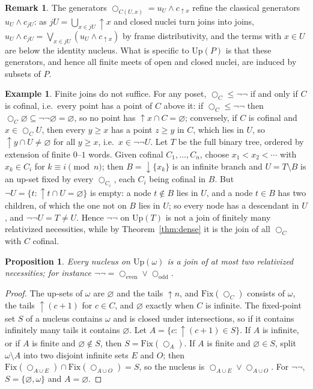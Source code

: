 \documentclass[11pt]{amsart}
\newtheorem{prop}[thm]{Proposition}
\theoremstyle{definition}
\newtheorem{rem}[thm]{Remark}
\newtheorem{ex}[thm]{Example}
\newcommand{\Fix}{\mathrm{Fix}}
\newcommand{\Up}{\mathrm{Up}}
\newcommand{\lax}{\bigcirc}
\newcommand{\dn}{{\downarrow}}
\newcommand{\upa}{{\uparrow}}
\begin{document}
\begin{rem}
The generators $\lax_{C(U,x)}=u_U\wedge c_{\upa x}$ refine the classical
generators $u_U\wedge c_{jU}$: as $jU=\bigcup_{x\in jU}\upa x$ and closed
nuclei turn joins into joins, $u_U\wedge c_{jU}=\bigvee_{x\in jU}(u_U\wedge
c_{\upa x})$ by frame distributivity, and the terms with $x\in U$ are below
the identity nucleus. What is specific to $\Up(P)$ is that these generators,
and hence all finite meets of open and closed nuclei, are induced by subsets
of $P$.
\end{rem}

\begin{ex}\label{ex:tree}
Finite joins do not suffice. For any poset, $\lax_C\le\neg\neg$ if and only
if $C$ is cofinal, i.e.\ every point has a point of $C$ above it: if
$\lax_C\le\neg\neg$ then $\lax_C\varnothing\subseteq\neg\neg\varnothing=
\varnothing$, so no point has $\upa x\cap C=\varnothing$; conversely, if $C$ is cofinal and $x\in\lax_CU$, then every $y\ge x$ has
a point $z\ge y$ in $C$, which lies in $U$, so $\upa y\cap U\ne\varnothing$
for all $y\ge x$, i.e.\ $x\in\neg\neg U$. Let
$T$ be the full binary tree, ordered by extension of finite $0$--$1$ words.
Given cofinal $C_1,\dots,C_n$, choose $x_1<x_2<\cdots$ with $x_k\in C_i$ for
$k\equiv i\pmod n$; then $B=\dn\{x_k\}$ is an infinite branch and $U=T\setminus
B$ is an up-set fixed by every $\lax_{C_i}$, each $C_i$ being cofinal in $B$.
But $\neg U=\{t:\upa t\cap U=\varnothing\}$ is empty: a node $t\notin B$
lies in $U$, and a node $t\in B$ has two children, of which the one not on
$B$ lies in $U$; so every node has a descendant in $U$, and
$\neg\neg U=T\ne U$. Hence $\neg\neg$ on $\Up(T)$ is not a join of finitely
many relativized necessities, while by Theorem~\ref{thm:dense} it is the join
of all $\lax_C$ with $C$ cofinal. \end{ex}

\begin{prop}\label{prop:omega}
Every nucleus on $\Up(\omega)$ is a join of at most two relativized
necessities; for instance $\neg\neg=\lax_{\mathrm{even}}\vee\lax_{\mathrm{odd}}$.
\end{prop}
\begin{proof}
The up-sets of $\omega$ are $\varnothing$ and the tails $\upa n$, and
$\Fix(\lax_C)$ consists of $\omega$, the tails $\upa(c+1)$ for $c\in C$, and
$\varnothing$ exactly when $C$ is infinite. The fixed-point set $S$ of a
nucleus contains $\omega$ and is closed under intersections, so if it
contains infinitely many tails it contains $\varnothing$. Let $A=\{c:\upa(c+1)
\in S\}$. If $A$ is infinite, or if $A$ is finite and $\varnothing\notin S$,
then $S=\Fix(\lax_A)$. If $A$ is finite and $\varnothing\in S$, split
$\omega\setminus A$ into two disjoint infinite sets $E$ and $O$; then
$\Fix(\lax_{A\cup E})\cap\Fix(\lax_{A\cup O})=S$, so the nucleus is
$\lax_{A\cup E}\vee\lax_{A\cup O}$. For $\neg\neg$, $S=\{\varnothing,\omega\}$
and $A=\varnothing$.
\end{proof}
\end{document}
